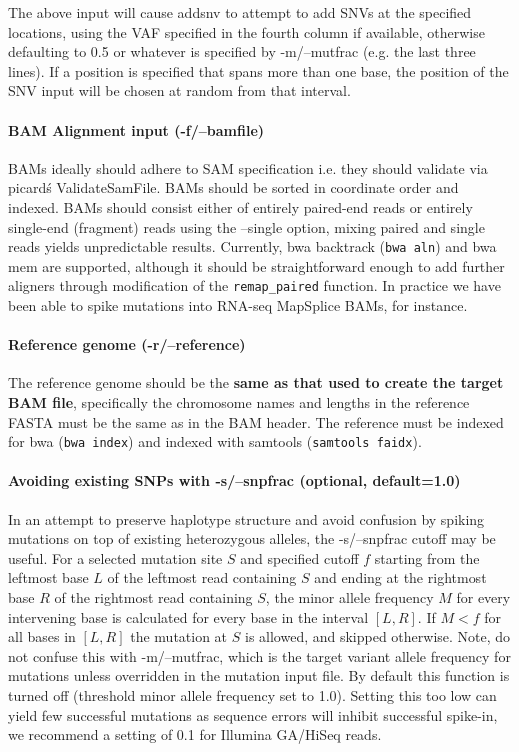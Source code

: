 \documentclass[letterpaper,11pt]{article}
\begin{document}
    The above input will cause addsnv to attempt to add SNVs at the specified locations, using the VAF specified in the fourth column if available, otherwise defaulting to 0.5 or whatever is specified by -m/--mutfrac (e.g. the last three lines). If a position is specified that spans more than one base, the position of the SNV input will be chosen at random from that interval.

\paragraph{BAM Alignment input (-f/--bamfile)}
	BAMs ideally should adhere to SAM specification i.e. they should validate via picard\'s ValidateSamFile. BAMs should be sorted in coordinate order and indexed. BAMs should consist either of entirely paired-end reads or entirely single-end (fragment) reads using the --single option, mixing paired and single reads yields unpredictable results. Currently, bwa backtrack (\texttt{bwa aln}) and bwa mem are supported, although it should be straightforward enough to add further aligners through modification of the \texttt{remap\_paired} function. In practice we have been able to spike mutations into RNA-seq MapSplice BAMs, for instance.

\paragraph{Reference genome (-r/--reference)}
	The reference genome should be the \textbf{same as that used to create the target BAM file}, specifically the chromosome names and lengths in the reference FASTA must be the same as in the BAM header. The reference must be indexed for bwa (\texttt{bwa index}) and indexed with samtools (\texttt{samtools faidx}).
	
\paragraph{Avoiding existing SNPs with -s/--snpfrac (optional, default=1.0)}
	In an attempt to preserve haplotype structure and avoid confusion by spiking mutations on top of existing heterozygous alleles, the -s/--snpfrac cutoff may be useful. For a selected mutation site $S$ and specified cutoff $f$ starting from the leftmost base $L$ of the leftmost read containing $S$ and ending at the rightmost base $R$ of the rightmost read containing $S$, the minor allele frequency $M$ for every intervening base is calculated for every base in the interval $[L,R]$. If $M < f$ for all bases in $[L,R]$ the mutation at $S$ is allowed, and skipped otherwise. Note, do not confuse this with -m/--mutfrac, which is the target variant allele frequency for mutations unless overridden in the mutation input file. By default this function is turned off (threshold minor allele frequency set to 1.0). Setting this too low can yield few successful mutations as sequence errors will inhibit successful spike-in, we recommend a setting of 0.1 for Illumina GA/HiSeq reads.
\end{document}
